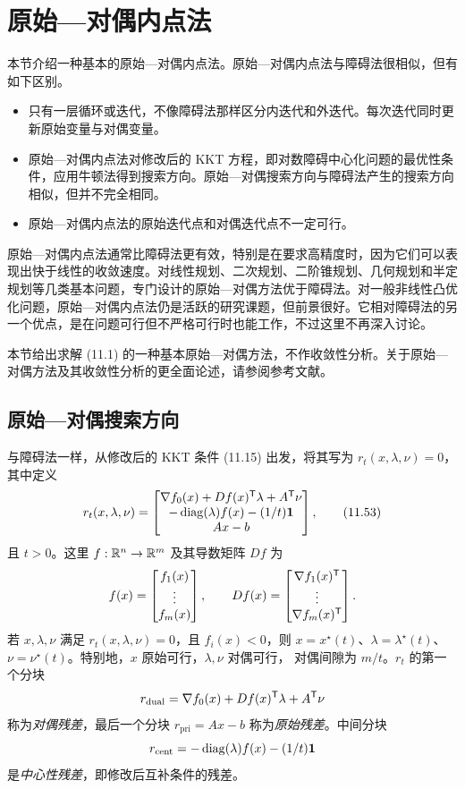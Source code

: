 \section{原始—对偶内点法}
本节介绍一种基本的原始—对偶内点法。原始—对偶内点法与障碍法很相似，但有如下区别。
\begin{itemize}
\item 只有一层循环或迭代，不像障碍法那样区分内迭代和外迭代。每次迭代同时更新原始变量与对偶变量。
\item 原始—对偶内点法对修改后的 KKT 方程，即对数障碍中心化问题的最优性条件，应用牛顿法得到搜索方向。原始—对偶搜索方向与障碍法产生的搜索方向相似，但并不完全相同。
\item 原始—对偶内点法的原始迭代点和对偶迭代点不一定可行。
\end{itemize}
原始—对偶内点法通常比障碍法更有效，特别是在要求高精度时，因为它们可以表现出快于线性的收敛速度。对线性规划、二次规划、二阶锥规划、几何规划和半定规划等几类基本问题，专门设计的原始—对偶方法优于障碍法。对一般非线性凸优化问题，原始—对偶内点法仍是活跃的研究课题，但前景很好。它相对障碍法的另一个优点，是在问题可行但不严格可行时也能工作，不过这里不再深入讨论。

本节给出求解 (11.1) 的一种基本原始—对偶方法，不作收敛性分析。关于原始—对偶方法及其收敛性分析的更全面论述，请参阅参考文献。

\subsection{原始—对偶搜索方向}
与障碍法一样，从修改后的 KKT 条件 (11.15) 出发，将其写为 $r_t(x,\lambda,\nu)=0$，其中定义
\begin{equation}
r_t(x,\lambda,\nu)=\begin{bmatrix}
\nabla f_0(x)+Df(x)^\mathsf T\lambda+A^\mathsf T\nu\\
-\operatorname{diag}(\lambda)f(x)-(1/t)\mathbf 1\\
Ax-b
\end{bmatrix},\tag{11.53}
\end{equation}
且 $t>0$。这里 $f:\mathbb R^n\to\mathbb R^m$ 及其导数矩阵 $Df$ 为
\[
f(x)=\begin{bmatrix}f_1(x)\\\vdots\\f_m(x)\end{bmatrix},\qquad
Df(x)=\begin{bmatrix}\nabla f_1(x)^\mathsf T\\\vdots\\\nabla f_m(x)^\mathsf T\end{bmatrix}.
\]
若 $x,\lambda,\nu$ 满足 $r_t(x,\lambda,\nu)=0$，且 $f_i(x)<0$，则 $x=x^\star(t)$、$\lambda=\lambda^\star(t)$、$\nu=\nu^\star(t)$。特别地，$x$ 原始可行，$\lambda,\nu$ 对偶可行，
对偶间隙为 $m/t$。$r_t$ 的第一个分块
\[
r_{\mathrm{dual}}=\nabla f_0(x)+Df(x)^\mathsf T\lambda+A^\mathsf T\nu
\]
称为\emph{对偶残差}，最后一个分块 $r_{\mathrm{pri}}=Ax-b$ 称为\emph{原始残差}。中间分块
\[
r_{\mathrm{cent}}=-\operatorname{diag}(\lambda)f(x)-(1/t)\mathbf 1
\]
是\emph{中心性残差}，即修改后互补条件的残差。


